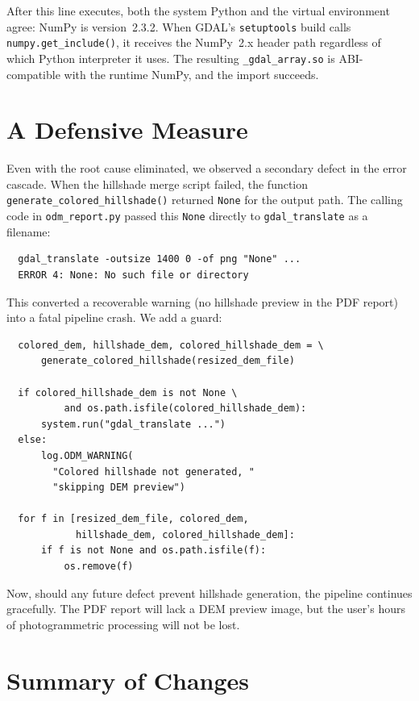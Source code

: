 \documentclass{article}
\begin{document}
\noindent After this line executes, both the system Python and the virtual
environment agree: NumPy is version~2.3.2.  When GDAL's
\texttt{setuptools} build calls \texttt{numpy.get\_include()}, it
receives the NumPy~2.x header path regardless of which Python
interpreter it uses.  The resulting \texttt{\_gdal\_array.so} is
ABI-compatible with the runtime NumPy, and the import succeeds.

\section{A Defensive Measure}

Even with the root cause eliminated, we observed a secondary defect in
the error cascade.  When the hillshade merge script failed, the
function \texttt{generate\_colored\_hillshade()} returned \texttt{None}
for the output path.  The calling code in \texttt{odm\_report.py}
passed this \texttt{None} directly to \texttt{gdal\_translate} as a
filename:

\begin{verbatim}
  gdal_translate -outsize 1400 0 -of png "None" ...
  ERROR 4: None: No such file or directory
\end{verbatim}

\noindent This converted a recoverable warning (no hillshade preview in
the PDF report) into a fatal pipeline crash.  We add a guard:

\begin{verbatim}
  colored_dem, hillshade_dem, colored_hillshade_dem = \
      generate_colored_hillshade(resized_dem_file)

  if colored_hillshade_dem is not None \
          and os.path.isfile(colored_hillshade_dem):
      system.run("gdal_translate ...")
  else:
      log.ODM_WARNING(
        "Colored hillshade not generated, "
        "skipping DEM preview")

  for f in [resized_dem_file, colored_dem,
            hillshade_dem, colored_hillshade_dem]:
      if f is not None and os.path.isfile(f):
          os.remove(f)
\end{verbatim}

\noindent Now, should any future defect prevent hillshade generation, the
pipeline continues gracefully.  The PDF report will lack a DEM
preview image, but the user's hours of photogrammetric processing
will not be lost.

\section{Summary of Changes}
\end{document}
